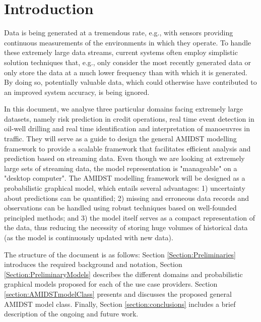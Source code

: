 \section{Introduction}

Data is being generated at a tremendous rate, e.g., with sensors providing continuous measurements of the environments in which they operate. To handle these extremely large data streams, current systems often employ simplistic solution techniques that, e.g., only consider the most recently generated data or only store the data at a much lower frequency than with which it is generated. By doing so, potentially valuable data, which could otherwise have contributed to an improved system accuracy, is being ignored. 

In this document, we analyse three particular domains facing extremely large datasets, namely risk prediction in credit operations, real time event detection in oil-well drilling and real time identification and interpretation of manoeuvres in traffic. They will serve as a guide to design the general AMIDST modelling framework to provide a scalable framework that facilitates efficient analysis and prediction based on streaming data. Even though we are looking at extremely large sets of streaming data, the model representation is "manageable" on a "desktop computer". The AMIDST modelling framework will be designed as a probabilistic graphical model, which entails several advantages: 1) uncertainty about predictions can be quantified; 2) missing and erroneous data records and observations can be handled using robust techniques based on well-founded principled methods; and 3) the model itself serves as a compact representation of the data, thus reducing the necessity of storing huge volumes of historical data (as the model is continuously updated with new data).

The structure of the document is as follows: Section \ref{Section:Preliminaries} introduces the required background and notation, Section \ref{Section:PreliminaryModels} describes the different domains and probabilistic graphical models proposed for each of the use case providers. Section \ref{section:AMIDSTmodelClass} presents and discusses the proposed general AMIDST model class. Finally, Section \ref{section:conclusions} includes a brief description of the ongoing and future work.